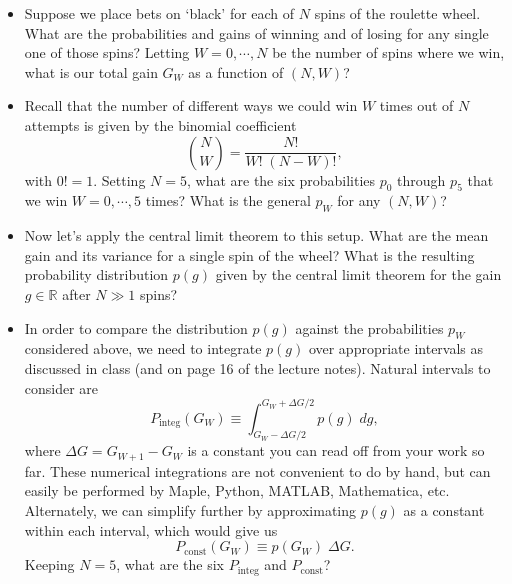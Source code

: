 \documentclass[12 pt]{article} %
\newcommand{\Rbb}{\ensuremath{\mathbb R} }
\newcommand{\De}{\ensuremath{\Delta} }
\begin{document}
\begin{itemize}
  \item Suppose we place  bets on `black' for each of $N$ spins of the roulette wheel.
        What are the probabilities and gains of winning and of losing for any single one of those spins?
        Letting $W = 0, \cdots, N$ be the number of spins where we win, what is our total gain $G_W$ as a function of $(N, W)$?
  \item Recall that the number of different ways we could win $W$ times out of $N$ attempts is given by the binomial coefficient
        \begin{equation*}
          \binom{N}{W} = \frac{N!}{W! \; (N - W)!},
        \end{equation*}
        with $0! = 1$.
        Setting $N = 5$, what are the six probabilities $p_0$ through $p_5$ that we win $W = 0, \cdots, 5$ times?
        What is the general $p_W$ for any $(N, W)$?
  \item Now let's apply the central limit theorem to this setup.
        What are the mean gain and its variance for a single spin of the wheel?
        What is the resulting probability distribution $p(g)$ given by the central limit theorem for the gain $g \in \Rbb$ after $N \gg 1$ spins?
  \item In order to compare the distribution $p(g)$ against the probabilities $p_W$ considered above, we need to integrate $p(g)$ over appropriate intervals as discussed in class (and on page 16 of the lecture notes).
        Natural intervals to consider are
        \begin{equation*}
          P_{\text{integ}}(G_W) \equiv \int_{G_W - \De G / 2}^{G_W + \De G / 2} p(g) \; dg,
        \end{equation*}
        where $\De G = G_{W + 1} - G_W$ is a constant you can read off from your work so far.
        These numerical integrations are not convenient to do by hand, but can easily be performed by Maple, Python, MATLAB, Mathematica, etc.
        Alternately, we can simplify further by approximating $p(g)$ as a constant within each interval, which would give us
        \begin{equation*}
          P_{\text{const}}(G_W) \equiv p(G_W) \; \De G.
        \end{equation*}
        Keeping $N = 5$, what are the six $P_{\text{integ}}$ and $P_{\text{const}}$?
\end{itemize}
\end{document}
